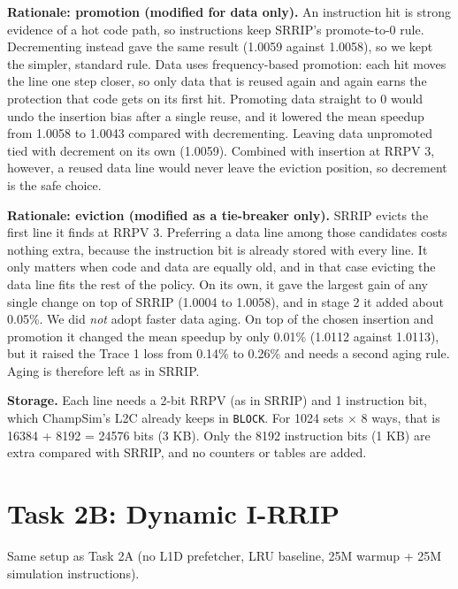 \documentclass[10pt]{article}
\begin{document}
\textbf{Rationale: promotion (modified for data only).} An instruction hit is strong evidence of a hot code path, so instructions keep SRRIP's promote-to-0 rule. Decrementing instead gave the same result (1.0059 against 1.0058), so we kept the simpler, standard rule. Data uses frequency-based promotion: each hit moves the line one step closer, so only data that is reused again and again earns the protection that code gets on its first hit. Promoting data straight to 0 would undo the insertion bias after a single reuse, and it lowered the mean speedup from 1.0058 to 1.0043 compared with decrementing. Leaving data unpromoted tied with decrement on its own (1.0059). Combined with insertion at RRPV 3, however, a reused data line would never leave the eviction position, so decrement is the safe choice.

\textbf{Rationale: eviction (modified as a tie-breaker only).} SRRIP evicts the first line it finds at RRPV 3. Preferring a data line among those candidates costs nothing extra, because the instruction bit is already stored with every line. It only matters when code and data are equally old, and in that case evicting the data line fits the rest of the policy. On its own, it gave the largest gain of any single change on top of SRRIP (1.0004 to 1.0058), and in stage 2 it added about 0.05\%. We did \emph{not} adopt faster data aging. On top of the chosen insertion and promotion it changed the mean speedup by only 0.01\% (1.0112 against 1.0113), but it raised the Trace 1 loss from 0.14\% to 0.26\% and needs a second aging rule. Aging is therefore left as in SRRIP.

\textbf{Storage.} Each line needs a 2-bit RRPV (as in SRRIP) and 1 instruction bit, which ChampSim's L2C already keeps in \texttt{BLOCK}. For 1024 sets $\times$ 8 ways, that is 16384 + 8192 = 24576 bits (3 KB). Only the 8192 instruction bits (1 KB) are extra compared with SRRIP, and no counters or tables are added.

\section*{Task 2B: Dynamic I-RRIP}
Same setup as Task 2A (no L1D prefetcher, LRU baseline, 25M warmup + 25M simulation instructions).
\end{document}
